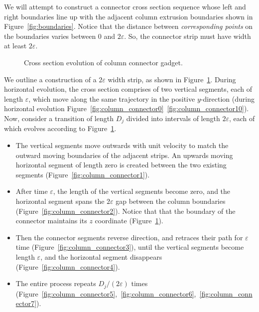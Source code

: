 We will attempt to construct a connector cross section sequence whose left and right boundaries
line up with the adjacent column extrusion boundaries shown in Figure~\ref{fig:boundaries}.
Notice that the distance between \emph{corresponding points} on the boundaries varies between $0$ and $2\varepsilon$.
So, the connector strip must have width at least $2\varepsilon$.
\graphicspath{{./figures/}}
\begin{figure}[]
    \def\svgwidth{1.0\textwidth}
    \caption{
    Cross section evolution of column connector gadget.
    }
    \vspace{-1.5em}
    \label{fig:connector_cross_section}
\end{figure}

We outline a construction of a $2\varepsilon$ width strip, as shown in Figure~\ref{fig:connector_cross_section}.
During horizontal evolution, the cross section comprises of two vertical segments, each of length $\varepsilon$,
which move along the same trajectory in the positive $y$-direction (during horizontal evolution Figure~\ref{fig:column_connector0}~\ref{fig:column_connector10}).
Now, consider a transition of length $D_j$ divided into intervals of length $2\varepsilon$, each of which evolves according to Figure~\ref{fig:connector_cross_section}.

\begin{itemize}
    \item The vertical segments move outwards with unit velocity to match the outward moving boundaries of the adjacent strips.
          An upwards moving horizontal segment of length zero is created between the two existing segments (Figure~\ref{fig:column_connector1}).
\end{itemize}

\begin{itemize}[resume, before = \vspace*{-\dimexpr\topsep+\partopsep\relax}]
    \item After time $\varepsilon$, the length of the vertical segments become zero,
          and the horizontal segment spans the $2\varepsilon$ gap between the column boundaries (Figure~\ref{fig:column_connector2}).
          Notice that that the boundary of the connector maintains its $z$ coordinate (Figure~\ref{fig:connector_cross_section}).
    \item Then the connector segments reverse direction, and retraces their path for $\varepsilon$ time (Figure~\ref{fig:column_connector3}),
          until the vertical segments become length $\varepsilon$, and the horizontal segment disappears (Figure~\ref{fig:column_connector4}).
    \item The entire process repeats $D_j/(2\varepsilon)$ times (Figure~\ref{fig:column_connector5},~\ref{fig:column_connector6},~\ref{fig:column_connector7}).
\end{itemize}

